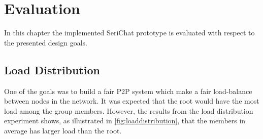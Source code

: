 \chapter{Evaluation}
\label{cha:evaluation}

%
%
%
%

In this chapter the implemented SeriChat prototype is evaluated with respect to the presented design goals. 

\section{Load Distribution}
One of the goals was to build a fair P2P system which make a fair load-balance between nodes in the network. It was expected that the root would have the most load among the group members. However, the results from the load distribution experiment shows, as illustrated in \autoref{fig:loaddistribution}, that the members in average has larger load than the root.

